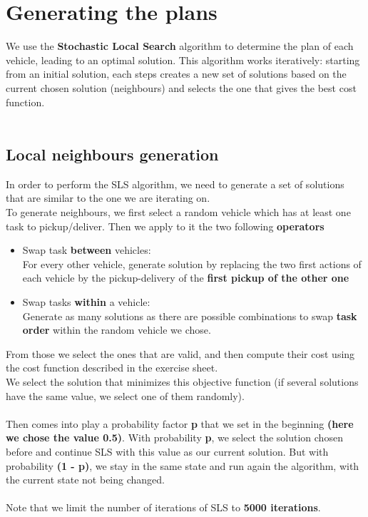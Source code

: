 \documentclass[fontsize=12pt]{scrartcl} %
\begin{document}
\section*{Generating the plans}

We use the \textbf{Stochastic Local Search} algorithm to determine the plan of each vehicle, leading to an optimal solution. This algorithm works iteratively: starting from an initial solution, each steps creates a new set of solutions based on the current chosen solution (neighbours) and selects the one that gives the best cost function. \\ \\

\subsection*{Local neighbours generation}

In order to perform the SLS algorithm, we need to generate a set of solutions that are similar to the one we are iterating on. \\

To generate neighbours, we first select a random vehicle which has at least one task to pickup/deliver. Then we apply to it the two following \textbf{operators}

\begin{itemize}
\item Swap task \textbf{between} vehicles: \\For every other vehicle, generate solution by replacing the two first actions of each vehicle by the pickup-delivery of the \textbf{first pickup of the other one}

\item Swap tasks \textbf{within} a vehicle: \\Generate as many solutions as there are possible combinations to swap \textbf{task order} within the random vehicle we chose.
\end{itemize}


From those we select the ones that are valid, and then compute their cost using the cost function described in the exercise sheet. \\
We select the solution that minimizes this objective function (if several solutions have the same value, we select one of them randomly). \\\\
Then comes into play a probability factor \textbf{p} that we set in the beginning \textbf{(here we chose the value 0.5)}. With probability \textbf{p}, we select the solution chosen before and continue SLS with this value as our current solution. But with probability \textbf{(1 - p)}, we stay in the same state and run again the algorithm, with the current state not being changed. \\\\
Note that we limit the number of iterations of SLS to \textbf{5000 iterations}.
\end{document}

